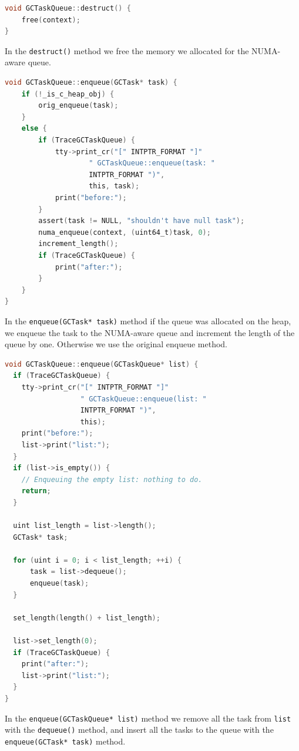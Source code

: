 \documentclass{article}
\begin{document}
 \begin{lstlisting}[language=C]
void GCTaskQueue::destruct() {
    free(context);
}
 \end{lstlisting}

 In the \lstinline{destruct()} method we free the memory we allocated for the NUMA-aware queue.

 \begin{lstlisting}[language=C]
void GCTaskQueue::enqueue(GCTask* task) {
    if (!_is_c_heap_obj) {
        orig_enqueue(task);
    }
    else {
        if (TraceGCTaskQueue) {
            tty->print_cr("[" INTPTR_FORMAT "]"
                    " GCTaskQueue::enqueue(task: "
                    INTPTR_FORMAT ")",
                    this, task);
            print("before:");
        }
        assert(task != NULL, "shouldn't have null task");
        numa_enqueue(context, (uint64_t)task, 0);
        increment_length();
        if (TraceGCTaskQueue) {
            print("after:");
        }
    }
}
 \end{lstlisting}

 In the \lstinline{enqueue(GCTask* task)} method if the queue was allocated on the heap, we enqueue the task to the NUMA-aware queue and increment the length of the queue by one. Otherwise we use the original enqueue method.

 \begin{lstlisting}[language=C]
void GCTaskQueue::enqueue(GCTaskQueue* list) {
  if (TraceGCTaskQueue) {
    tty->print_cr("[" INTPTR_FORMAT "]"
                  " GCTaskQueue::enqueue(list: "
                  INTPTR_FORMAT ")",
                  this);
    print("before:");
    list->print("list:");
  }
  if (list->is_empty()) {
    // Enqueuing the empty list: nothing to do.
    return;
  }

  uint list_length = list->length();
  GCTask* task;

  for (uint i = 0; i < list_length; ++i) {
      task = list->dequeue();
      enqueue(task);
  }

  set_length(length() + list_length);
  
  list->set_length(0);
  if (TraceGCTaskQueue) {
    print("after:");
    list->print("list:");
  }
}
 \end{lstlisting}

 In the \lstinline{enqueue(GCTaskQueue* list)} method we remove all the task from \lstinline{list} with the \lstinline{dequeue()} method, and insert all the tasks to the queue with the \lstinline{enqueue(GCTask* task)} method.
\end{document}
